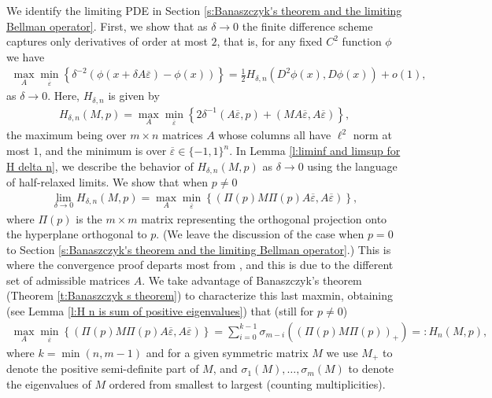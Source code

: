 \documentclass[reqno]{amsart}
\numberwithin{equation}{section}
\begin{document}
We identify the limiting PDE in Section \ref{s:Banaszczyk's theorem and the limiting Bellman operator}.  First, we show that as $\delta \to 0$ the finite difference scheme captures only derivatives of order at most $2$, that is, for any fixed $C^2$ function $\phi$ we have
\begin{align*}
  \max_A\min_{\overline \varepsilon}\left \{\delta^{-2}(\phi(x+\delta A\overline\varepsilon)-\phi(x)) \right \} = \tfrac{1}{2}H_{\delta,n}(D^2\phi(x),D\phi(x))+o(1),
\end{align*}
as $\delta \to 0$. Here, $H_{\delta,n}$ is given by
\begin{align*}
  H_{\delta,n}(M,p) = \max_{A}\min_{\overline\varepsilon}\left \{ 2\delta^{-1}(A\overline\varepsilon,p)+(MA\overline\varepsilon,A\overline\varepsilon) \right \},
\end{align*}
the maximum being over $m\times n$ matrices $A$ whose columns all have $\ell^2$ norm at most $1$, and the minimum is over $\overline\varepsilon \in \{-1,1\}^n$. In Lemma \ref{l:liminf and limsup for H delta n}, we describe the behavior of $H_{\delta,n}(M,p)$ as $\delta \to 0$ using the language of half-relaxed limits. We show that when $p\neq 0$
\begin{align*}
  \lim \limits_{\delta \to 0}H_{\delta,n}(M,p) = \max_{A}\min_{\overline\varepsilon}\left \{(\Pi(p)M\Pi(p)A\overline\varepsilon,A\overline\varepsilon) \right \},   
\end{align*}
where $\Pi(p)$ is the $m\times m$ matrix representing the orthogonal projection onto the hyperplane orthogonal to $p$. (We leave the discussion of the case when $p=0$ to Section \ref{s:Banaszczyk's theorem and the limiting Bellman operator}.) This is where the convergence proof departs most from \cite{KohnSerfaty2006}, and this is due to the different set of admissible matrices $A$. We take advantage of Banaszczyk's theorem (Theorem \ref{t:Banaszczyk s theorem}) to characterize this last maxmin, obtaining (see  Lemma \ref{l:H n is sum of positive eigenvalues}) that (still for $p\neq 0$) 
\begin{align*}
  \max_{A}\min_{\overline\varepsilon}\left \{(\Pi(p)M\Pi(p)A\overline\varepsilon,A\overline\varepsilon) \right \} = \sum \limits_{i=0}^{k-1}\sigma_{m-i}((\Pi(p)M\Pi(p))_+) =: H_n(M,p),   
\end{align*}
where $k = \min(n,m-1)$ and  for a given symmetric matrix $M$ we use $M_+$ to denote the positive semi-definite part of $M$, and $\sigma_1(M),\ldots,\sigma_m(M)$ to denote the eigenvalues of $M$ ordered from smallest to largest (counting multiplicities). 
\end{document}
